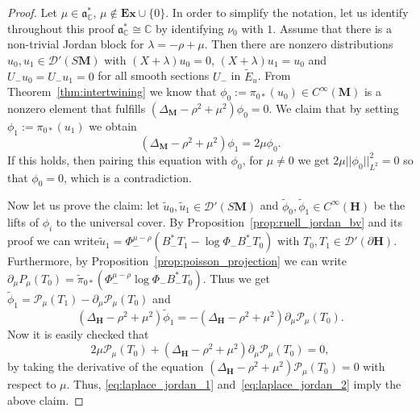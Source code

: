 \documentclass[10pt]{amsart}
\theoremstyle{definition}
\newcommand{\cc}{\mathbb{C}}
\newcommand{\bfh}{\mathbf{H}}
\newcommand{\bfm}{\mathbf{M}}
\newcommand{\pl}{\partial}
\newcommand{\til}{\widetilde}
\renewcommand{\a}{\mathfrak a}
\begin{document}
\begin{proof}
Let $\mu\in \a^*_\cc$, $\mu\notin \mathbf{Ex}\cup\{0\}$. In order to simplify the notation, let us identify throughout this proof $\a^*_\cc\cong \cc$ by identifying $\nu_0$ with $1$. Assume that there is a non-trivial Jordan block for $\lambda =-\rho+\mu$. Then there are nonzero distributions $u_0, u_1\in \mathcal D'(S{\bfm})$ with $(X +\lambda)u_0 =0$, $(X +\lambda)u_1=u_0$ and $U_- u_{0}=U_-u_1=0$ for all smooth sections $U_-$ in $\til{E}_u$. From Theorem~\ref{thm:intertwining} we know that $\phi_0:=\pi_{0*}(u_0)\in C^\infty({\bfm})$ is a nonzero element that fulfills $(\Delta_{\bfm} - \rho^2+\mu^2)\phi_0 =0$. We claim that by setting $\phi_1:= \pi_{0*}(u_1)$ we obtain
\[
\left(\Delta_{\bfm} - \rho^2+\mu^2\right)\phi_1 =2\mu\phi_0.
\]
If this holds, then pairing this equation with $\phi_0$, for $\mu\not=0$ we get $2\mu||\phi_0||_{L^2}^2=0$ so that $\phi_0=0$, which is a contradiction.

Now let us prove the claim: let $\til u_0, \til u_1\in \mathcal D'(S{\bfm})$ and $\til \phi_0, \til \phi_1 \in C^\infty ({\bfh})$ be the lifts of $\phi_i$ to the universal cover. By Proposition~\ref{prop:ruell_jordan_bv} and its proof we can write\linebreak$\til u_1 = \Phi_-^{\mu-\rho}(B_-^*T_1 - \log \Phi_- B_-^*T_0)$ with $T_0, T_1\in \mathcal D'(\pl {\bfh})$. Furthermore, by Proposition~\ref{prop:poisson_projection} we can write $\partial_\mu P_\mu(T_0) = \til \pi_{0*}(\Phi_-^{\mu-\rho}\log\Phi_- B_-^*T_0)$. Thus we get $\til \phi_1= \mathcal P_\mu (T_1) - \partial_\mu \mathcal P_\mu(T_0)$ and
\begin{equation}\label{eq:laplace_jordan_1}
\left(\Delta_{{\bfh}} - \rho^2+\mu^2\right)\til{\phi}_1 = -\left(\Delta_{{\bfh}} - \rho^2+\mu^2\right)\partial_\mu\mathcal P_\mu(T_0).
\end{equation}
Now it is easily checked that
\begin{equation}\label{eq:laplace_jordan_2}
2\mu \mathcal P_\mu(T_0) +\left(\Delta_{{\bfh}} -\rho^2+\mu^2\right)\partial_\mu\mathcal P_\mu(T_0) =0,
\end{equation}
by taking the derivative of the equation $(\Delta_{{\bfh}} -\rho^2+\mu^2)\mathcal P_\mu(T_0)=0$ with respect to $\mu$. Thus, \eqref{eq:laplace_jordan_1} and~\eqref{eq:laplace_jordan_2} imply the above claim.


\end{proof}
\end{document}
